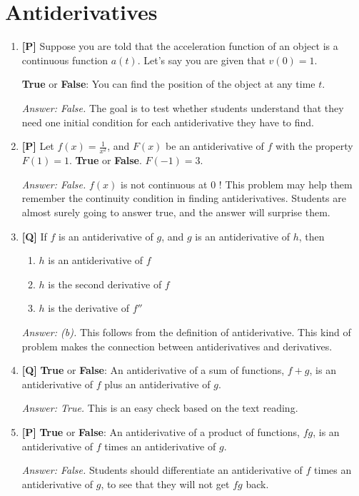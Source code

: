 \documentclass[12pt]{article}
\begin{document}
\pagebreak
\section{Antiderivatives}

\begin{enumerate}

\item {\bf [P]}
Suppose you are told that the acceleration function of an object
is a continuous function $a(t)$. Let's say you are given that
$v(0)=1$.

{\bf True} or \textbf{False}: You can find the position of the
object at any time $t$.

{\it Answer: False.} The goal is to test whether students
understand that they need one initial condition for each
antiderivative they have to find. 

\bigskip

\item {\bf [P]}
Let $f(x)=\frac{1}{x^2}$, and $F(x)$ be an antiderivative of
$f$ with the property $F(1)=1$.
{\bf True} or \textbf{False}. $F(-1)=3$.

{\it Answer: False.} $f(x)$ is not continuous at 0 ! This problem may help
them remember the continuity condition in finding antiderivatives. Students are almost surely going to answer true, and the answer will surprise them. 

\bigskip

\item {\bf [Q]} If $f$ is an antiderivative of $g$, and $g$ is an antiderivative of $h$, then 
\begin {enumerate}
\item $h$ is an antiderivative of $f$
\item $h$ is the second derivative of $f$
\item $h$ is the derivative of $f''$
\end {enumerate}

{\it Answer: (b).} This follows from the definition of antiderivative. This kind of problem makes the connection between antiderivatives and derivatives.

\bigskip

\item {\bf [Q]} {\bf True} or \textbf{False}: An antiderivative of a sum of functions, $f+g$,  is an antiderivative of $f$ plus an antiderivative of $g$.

{\it Answer: True.} This is an easy check based on the text reading.

\bigskip

\item {\bf [P]} {\bf True} or \textbf{False}: An antiderivative of a product  of functions, $fg$,  is an antiderivative of $f$ times an antiderivative of $g$.

{\it Answer: False.} Students should differentiate an antiderivative of $f$ times an antiderivative of $g$, to see that they will not get $fg$ back.

\end{enumerate}
\end{document}
